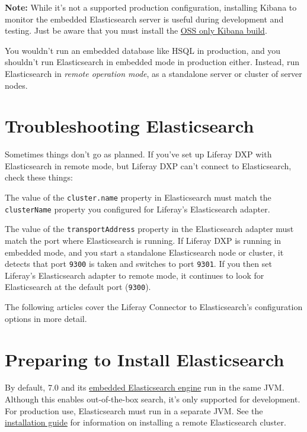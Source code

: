 \noindent\hrulefill

\textbf{Note:} While it's not a supported production configuration,
installing Kibana to monitor the embedded Elasticsearch server is useful
during development and testing. Just be aware that you must install the
\href{https://www.elastic.co/downloads/kibana-oss}{OSS only Kibana
build}.

\noindent\hrulefill

You wouldn't run an embedded database like HSQL in production, and you
shouldn't run Elasticsearch in embedded mode in production either.
Instead, run Elasticsearch in \emph{remote operation mode}, as a
standalone server or cluster of server nodes.

\section{Troubleshooting
Elasticsearch}\label{troubleshooting-elasticsearch}

Sometimes things don't go as planned. If you've set up Liferay DXP with
Elasticsearch in remote mode, but Liferay DXP can't connect to
Elasticsearch, check these things:

\begin{description}
\tightlist
\item[\textbf{Cluster name:}]
The value of the \texttt{cluster.name} property in Elasticsearch must
match the \texttt{clusterName} property you configured for Liferay's
Elasticsearch adapter.
\item[\textbf{Transport address:}]
The value of the \texttt{transportAddress} property in the Elasticsearch
adapter must match the port where Elasticsearch is running. If Liferay
DXP is running in embedded mode, and you start a standalone
Elasticsearch node or cluster, it detects that port \texttt{9300} is
taken and switches to port \texttt{9301}. If you then set Liferay's
Elasticsearch adapter to remote mode, it continues to look for
Elasticsearch at the default port (\texttt{9300}).
\end{description}

The following articles cover the Liferay Connector to Elasticsearch's
configuration options in more detail.

\section{Preparing to Install
Elasticsearch}\label{preparing-to-install-elasticsearch}

By default, 7.0 and its
\href{/docs/7-1/deploy/-/knowledge_base/d/configuring-elasticsearch-for-liferay-0\#embedded-vs-remote-operation-mode}{embedded
Elasticsearch engine} run in the same JVM. Although this enables
out-of-the-box search, it's only supported for development. For
production use, Elasticsearch must run in a separate JVM. See the
\href{/docs/7-1/deploy/-/knowledge_base/d/installing-elasticsearch}{installation
guide} for information on installing a remote Elasticsearch cluster.

